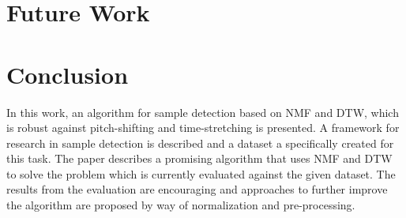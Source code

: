 \documentclass{article}
\begin{document}





\section{Future Work}


\section{Conclusion}

In this work, an algorithm for sample detection based on NMF and DTW, which is robust against pitch-shifting and time-stretching is presented. A framework for research in sample detection is described and a dataset a specifically created for this task. The paper describes a promising algorithm that uses NMF and DTW to solve the problem which is currently evaluated against the given dataset. The results from the evaluation are encouraging and approaches to further improve the algorithm are proposed by way of normalization and pre-processing.
\end{document}
